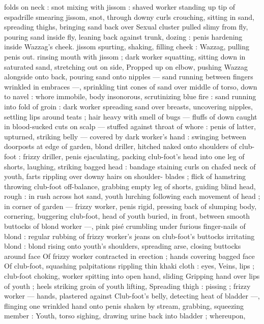 folds on neck : snot mixing with jissom : shaved worker standing up 
tip of espadrille smearing jissom, snot, through downy curls 
crouching, sitting in sand, spreading thighs, bringing sand back over 
Sexual cluster pulled slimy from fly, pouring sand inside fly, leaning 
back against trunk, dozing : penis hardening inside Wazzag's cheek. 
jissom spurting, shaking, filling cheek : Wazzag, pulling penis out. 
rinsing mouth with jissom ; dark worker squatting, sitting down in 
saturated sand, stretching out on side, Propped up on elbow, 
pushing Wazzag alongside onto back, pouring sand onto nipples --- 
sand running between fingers wrinkled in embraces ---, sprinkling 
tint cones of sand over middle of torso, down to navel : whore 
immobile, body insonorous, scrutinizing blue fire : sand running into 
fold of groin : dark worker spreading sand over breasts, uncovering 
nipples, settling lips around teats ; hair heavy with smell of bugs --- 
fluffs of down caught in blood-sucked cuts on scalp --- stuffed 
against throat of whore : penis of latter, upturned, striking belly --- 
covered by dark worker's hand : swinging between doorposts at edge 
of garden, blond driller, hitched naked onto shoulders of club-foot : 
frizzy driller, penis ejaculating, packing club-foot's head into one leg 
of shorts, laughing, striking bagged head : bandage staining curls on 
chafed neck of youth, farts rippling over downy hairs on shoulder- 
blades ; flick of hamstring throwing club-foot off-balance, grabbing 
empty leg of shorts, guiding blind head, rough : in rush across hot 
sand, youth lurching following each movement of head ; in corner of 
garden --- frizzy worker, penis rigid, pressing back of slumping 
body, cornering, buggering club-foot, head of youth buried, in front, 
between smooth buttocks of blond worker ---, pink pisé crumbling 
under furious finger-nails of blond : regular rubbing of frizzy 
worker's jeans on club-foot's buttocks irritating blond : blond rising 
onto youth's shoulders, spreading arse, closing buttocks around face 
Of frizzy worker contracted in erection ; hands covering bagged face 
Of club-foot, squashing palpitations rippling thin khaki cloth : eyes, 
Veins, lips ; club-foot choking, worker spitting into open hand, sliding 
Gripping hand over lips of youth ; heels striking groin of youth lifting, 
Spreading thigh : pissing ; frizzy worker --- hands, plastered against 
Club-foot's belly, detecting heat of bladder ---, flinging one wrinkled 
hand onto penis shaken by stream, grabbing, squeezing member : 
Youth, torso sighing, drawing urine back into bladder ; whereupon, 
